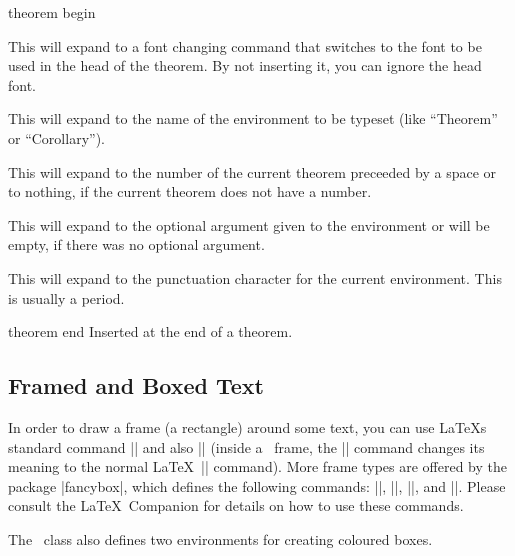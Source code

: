 \begin{element}{theorem begin}
\begin{itemize}
    \iteminsert{\inserttheoremheadfont}
    This will expand to a font changing command that switches to the
    font to be used in the head of the theorem. By not inserting it, you
    can ignore the head font.

    \iteminsert{\inserttheoremname}
    This will expand to the name of the environment to be typeset (like
    ``Theorem'' or ``Corollary''). 

    \iteminsert{\inserttheoremnumber}
    This will expand to the number of the current theorem preceeded by a
    space or to nothing, if the current theorem does not have a number.

    \iteminsert{\inserttheoremaddition}
    This will expand to the optional argument given to the environment
    or will be empty, if there was no optional argument.

    \iteminsert{\inserttheorempunctuation}
    This will expand to the punctuation character for the current
    environment. This is usually a period.
  \end{itemize}
\end{element}

\begin{element}{theorem end}\yes\no\no
  Inserted at the end of a theorem.
\end{element}



\subsection{Framed and Boxed Text}

In order to draw a frame (a rectangle) around some text, you can use
\LaTeX s standard command |\fbox| and also |\frame| (inside a \beamer{}, the |\frame| command changes its meaning to the normal \LaTeX\
|\frame| command). More frame types are offered by the
package |fancybox|, which defines the following commands:
|\shadowbox|, |\doublebox|, |\ovalbox|, and |\Ovalbox|. Please consult
the \LaTeX\ Companion for details on how to use these commands.

The \beamer\ class also defines two environments for creating coloured
boxes.


